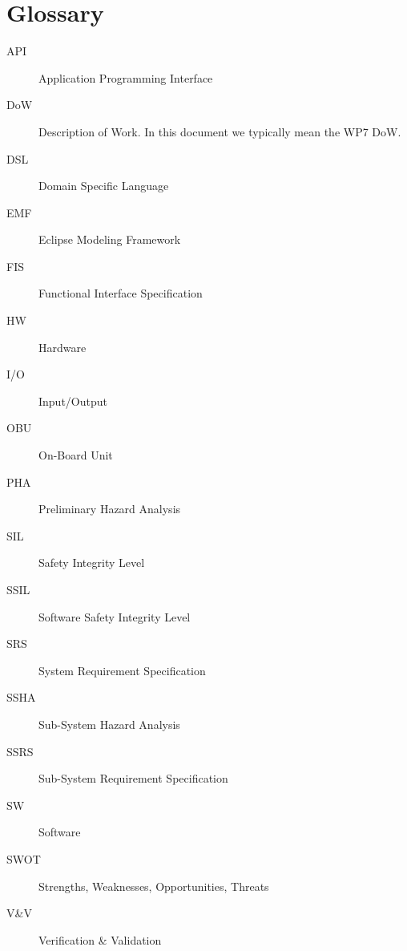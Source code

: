 



\section{Glossary}
\label{sec:glossary}

\begin{description}
\item[API] Application Programming Interface
\item[DoW] Description of Work.  In this document we typically mean the WP7 DoW.
\item[DSL] Domain Specific Language
\item[EMF] Eclipse Modeling Framework
\item[FIS] Functional Interface Specification
\item[HW] Hardware
\item[I/O] Input/Output
\item[OBU] On-Board Unit
\item[PHA] Preliminary Hazard Analysis
\item[SIL] Safety Integrity Level
\item[SSIL] Software Safety Integrity Level
\item[SRS] System Requirement Specification
\item[SSHA] Sub-System Hazard Analysis
\item[SSRS] Sub-System Requirement Specification
\item[SW] Software
\item[SWOT] Strengths, Weaknesses, Opportunities, Threats
\item[V\&V] Verification \& Validation
\end{description}



